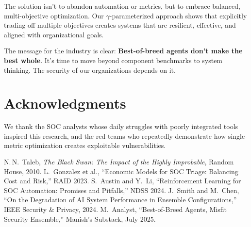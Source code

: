 \documentclass[11pt]{article}
\begin{document}
The solution isn't to abandon automation or metrics, but to embrace balanced, multi-objective optimization. Our $\gamma$-parameterized approach shows that explicitly trading off multiple objectives creates systems that are resilient, effective, and aligned with organizational goals.

The message for the industry is clear: \textbf{Best-of-breed agents don't make the best whole}. It's time to move beyond component benchmarks to system thinking. The security of our organizations depends on it.

\section*{Acknowledgments}
We thank the SOC analysts whose daily struggles with poorly integrated tools inspired this research, and the red teams who repeatedly demonstrate how single-metric optimization creates exploitable vulnerabilities.


\begin{thebibliography}{9}
 N.\,N.~Taleb, \emph{The Black Swan: The Impact of the Highly Improbable}, Random House, 2010.
 L.~Gonzalez et al., ``Economic Models for SOC Triage: Balancing Cost and Risk,'' RAID 2023.
 S.~Austin and Y.~Li, ``Reinforcement Learning for SOC Automation: Promises and Pitfalls,'' NDSS 2024.
 J.~Smith and M.~Chen, ``On the Degradation of AI System Performance in Ensemble Configurations,'' IEEE Security \& Privacy, 2024.
 M.~Analyst, ``Best-of-Breed Agents, Misfit Security Ensemble,'' Manish's Substack, July 2025.
\end{thebibliography}
\end{document}

